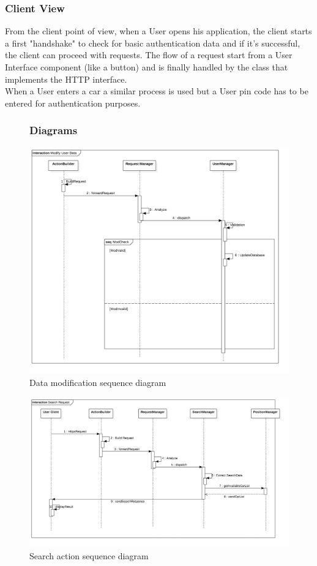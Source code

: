 \subsubsection{Client View}
From the client point of view, when a User opens his application, the client starts a first "handshake" to check for basic authentication data and if it's successful, the client can proceed with requests.
The flow of a request start from a User Interface component (like a button) and is finally handled by the class that implements the HTTP interface.\\
When a User enters a car a similar process is used but a User pin code has to be entered for authentication purposes.\\
\newpage
\FloatBarrier
\begin{figure}
\subsubsection{Diagrams}
\centering
\includegraphics[scale=0.4]{Images/Sequence/seq1.png}
\caption{Data modification sequence diagram}
\end{figure}
\FloatBarrier
\clearpage
\FloatBarrier
\begin{figure}
\centering
\includegraphics[scale=0.4]{Images/Sequence/seq2.png}
\caption{Search action sequence diagram}
\end{figure}
